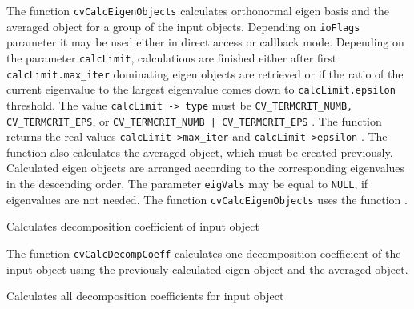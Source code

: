 {The function \texttt{cvCalcEigenObjects} calculates orthonormal eigen basis and the averaged object for a group of the input objects. Depending on \texttt{ioFlags} parameter it may be used either in direct access or callback mode. Depending on the parameter \texttt{calcLimit}, calculations are finished either after first \texttt{calcLimit.max\_iter} dominating eigen objects are retrieved or if the ratio of the current eigenvalue to the largest eigenvalue comes down to \texttt{calcLimit.epsilon} threshold. The value \texttt{calcLimit -> type} must be \texttt{CV\_TERMCRIT\_NUMB, CV\_TERMCRIT\_EPS}, or \texttt{CV\_TERMCRIT\_NUMB | CV\_TERMCRIT\_EPS} . The function returns the real values \texttt{calcLimit->max\_iter} and \texttt{calcLimit->epsilon} .
\newline
\newline
The function also calculates the averaged object, which must be created previously. Calculated eigen objects are arranged according to the corresponding eigenvalues in the descending order.
\newline
\newline
The parameter \texttt{eigVals} may be equal to \texttt{NULL}, if eigenvalues are not needed.
\newline
\newline
The function \texttt{cvCalcEigenObjects} uses the function .


Calculates decomposition coefficient of input object


\begin{description}
\end{description}

The function \texttt{cvCalcDecompCoeff} calculates one decomposition coefficient of the input object using the previously calculated eigen object and the averaged object.


Calculates all decomposition coefficients for input object

}
